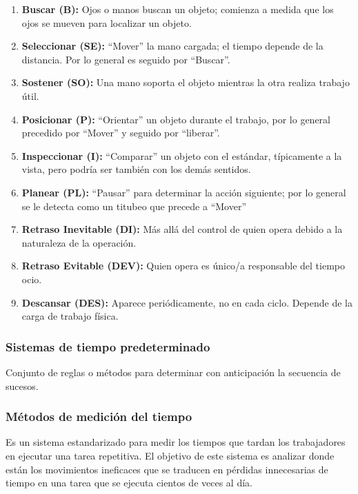 \begin{enumerate}
        \item \textbf{Buscar (B):} Ojos o manos buscan un objeto; comienza a medida que los ojos se mueven para localizar un objeto.
        \item \textbf{Seleccionar (SE):} “Mover” la mano cargada; el tiempo depende de la distancia. Por lo general es seguido por “Buscar”.
        \item \textbf{Sostener (SO):} Una mano soporta el objeto mientras la otra realiza trabajo útil.
        \item \textbf{Posicionar (P):} “Orientar” un objeto durante el trabajo, por lo general precedido por “Mover” y seguido por “liberar”.
        \item \textbf{Inspeccionar (I):} “Comparar” un objeto con el estándar, típicamente a la vista, pero podría ser también con los demás sentidos.
        \item \textbf{Planear (PL):} “Pausar” para determinar la acción siguiente; por lo general se le detecta como un titubeo que precede a “Mover”
        \item \textbf{Retraso Inevitable (DI):} Más allá del control de quien opera debido a la naturaleza de la operación.
        \item \textbf{Retraso Evitable (DEV):} Quien opera es único/a responsable del tiempo ocio.
        \item \textbf{Descansar (DES):} Aparece periódicamente, no en cada ciclo. Depende de la carga de trabajo física.
    
    \end{enumerate}
    
    \subsubsection{Sistemas de tiempo predeterminado}
    
    Conjunto de reglas o métodos para determinar con anticipación la secuencia de sucesos.
    
    \subsubsection{Métodos de medición del tiempo}
    
     Es un sistema estandarizado para medir los tiempos que tardan los trabajadores en ejecutar una tarea repetitiva. El objetivo de este sistema es analizar donde están los movimientos ineficaces que se traducen en pérdidas innecesarias de tiempo en una tarea que se ejecuta cientos de veces al día. \cite{DanielGrifol}
    
